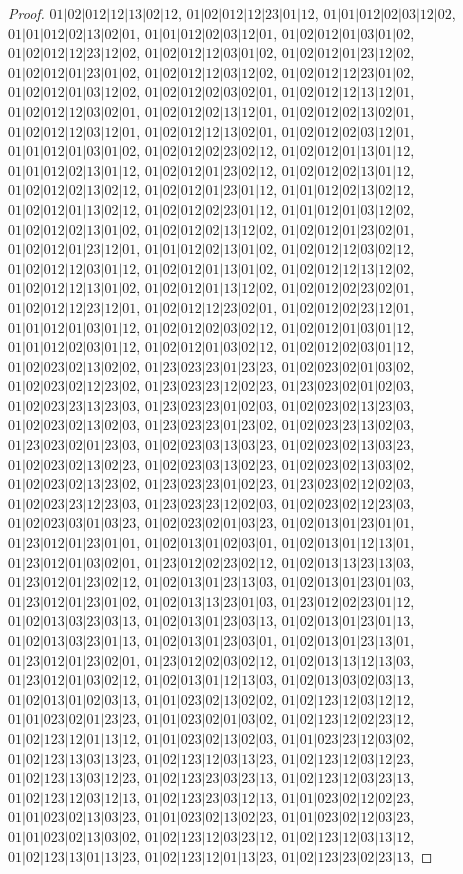 \documentclass[12pt]{article}
\theoremstyle{plain}
\theoremstyle{definition}
\theoremstyle{remark}
\begin{document}
\begin{proof}
$01|02|012|12|13|02|12$, $01|02|012|12|23|01|12$, $01|01|012|02|03|12|02$, $01|01|012|02|13|02|01$, $01|01|012|02|03|12|01$, $01|02|012|01|03|01|02$, $01|02|012|12|23|12|02$, $01|02|012|12|03|01|02$, $01|02|012|01|23|12|02$, $01|02|012|01|23|01|02$, $01|02|012|12|03|12|02$, $01|02|012|12|23|01|02$, $01|02|012|01|03|12|02$, $01|02|012|02|03|02|01$, $01|02|012|12|13|12|01$, $01|02|012|12|03|02|01$, $01|02|012|02|13|12|01$, $01|02|012|02|13|02|01$, $01|02|012|12|03|12|01$, $01|02|012|12|13|02|01$, $01|02|012|02|03|12|01$, $01|01|012|01|03|01|02$, $01|02|012|02|23|02|12$, $01|02|012|01|13|01|12$, $01|01|012|02|13|01|12$, $01|02|012|01|23|02|12$, $01|02|012|02|13|01|12$, $01|02|012|02|13|02|12$, $01|02|012|01|23|01|12$, $01|01|012|02|13|02|12$, $01|02|012|01|13|02|12$, $01|02|012|02|23|01|12$, $01|01|012|01|03|12|02$, $01|02|012|02|13|01|02$, $01|02|012|02|13|12|02$, $01|02|012|01|23|02|01$, $01|02|012|01|23|12|01$, $01|01|012|02|13|01|02$, $01|02|012|12|03|02|12$, $01|02|012|12|03|01|12$, $01|02|012|01|13|01|02$, $01|02|012|12|13|12|02$, $01|02|012|12|13|01|02$, $01|02|012|01|13|12|02$, $01|02|012|02|23|02|01$, $01|02|012|12|23|12|01$, $01|02|012|12|23|02|01$, $01|02|012|02|23|12|01$, $01|01|012|01|03|01|12$, $01|02|012|02|03|02|12$, $01|02|012|01|03|01|12$, $01|01|012|02|03|01|12$, $01|02|012|01|03|02|12$, $01|02|012|02|03|01|12$, $01|02|023|02|13|02|02$, $01|23|023|23|01|23|23$, $01|02|023|02|01|03|02$, $01|02|023|02|12|23|02$, $01|23|023|23|12|02|23$, $01|23|023|02|01|02|03$, $01|02|023|23|13|23|03$, $01|23|023|23|01|02|03$, $01|02|023|02|13|23|03$, $01|02|023|02|13|02|03$, $01|23|023|23|01|23|02$, $01|02|023|23|13|02|03$, $01|23|023|02|01|23|03$, $01|02|023|03|13|03|23$, $01|02|023|02|13|03|23$, $01|02|023|02|13|02|23$, $01|02|023|03|13|02|23$, $01|02|023|02|13|03|02$, $01|02|023|02|13|23|02$, $01|23|023|23|01|02|23$, $01|23|023|02|12|02|03$, $01|02|023|23|12|23|03$, $01|23|023|23|12|02|03$, $01|02|023|02|12|23|03$, $01|02|023|03|01|03|23$, $01|02|023|02|01|03|23$, $01|02|013|01|23|01|01$, $01|23|012|01|23|01|01$, $01|02|013|01|02|03|01$, $01|02|013|01|12|13|01$, $01|23|012|01|03|02|01$, $01|23|012|02|23|02|12$, $01|02|013|13|23|13|03$, $01|23|012|01|23|02|12$, $01|02|013|01|23|13|03$, $01|02|013|01|23|01|03$, $01|23|012|01|23|01|02$, $01|02|013|13|23|01|03$, $01|23|012|02|23|01|12$, $01|02|013|03|23|03|13$, $01|02|013|01|23|03|13$, $01|02|013|01|23|01|13$, $01|02|013|03|23|01|13$, $01|02|013|01|23|03|01$, $01|02|013|01|23|13|01$, $01|23|012|01|23|02|01$, $01|23|012|02|03|02|12$, $01|02|013|13|12|13|03$, $01|23|012|01|03|02|12$, $01|02|013|01|12|13|03$, $01|02|013|03|02|03|13$, $01|02|013|01|02|03|13$, $01|01|023|02|13|02|02$, $01|02|123|12|03|12|12$, $01|01|023|02|01|23|23$, $01|01|023|02|01|03|02$, $01|02|123|12|02|23|12$, $01|02|123|12|01|13|12$, $01|01|023|02|13|02|03$, $01|01|023|23|12|03|02$, $01|02|123|13|03|13|23$, $01|02|123|12|03|13|23$, $01|02|123|12|03|12|23$, $01|02|123|13|03|12|23$, $01|02|123|23|03|23|13$, $01|02|123|12|03|23|13$, $01|02|123|12|03|12|13$, $01|02|123|23|03|12|13$, $01|01|023|02|12|02|23$, $01|01|023|02|13|03|23$, $01|01|023|02|13|02|23$, $01|01|023|02|12|03|23$, $01|01|023|02|13|03|02$, $01|02|123|12|03|23|12$, $01|02|123|12|03|13|12$, $01|02|123|13|01|13|23$, $01|02|123|12|01|13|23$, $01|02|123|23|02|23|13$, 
\end{proof}
\end{document}

